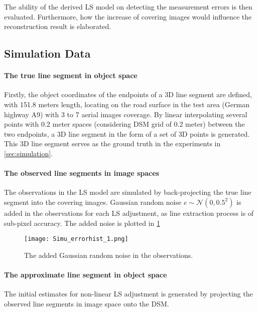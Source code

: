 The ability of the derived LS model on detecting the measurement errors is then evaluated. Furthermore, how the increase of covering images would influence the reconstruction result is elaborated.





\subsection{Simulation Data}
\label{subsec:simudata}

\paragraph{The true line segment in object space}
Firstly, the object coordinates of the endpoints of a 3D line segment are defined, with 151.8 meters length, locating on the road surface in the test area (German highway A9) with 3 to 7 aerial images coverage. By linear interpolating several points with 0.2 meter spaces (considering DSM grid of 0.2 meter) between the two endpoints, a 3D line segment in the form of a set of 3D points is generated. This 3D line segment serves as the ground truth in the experiments in \cref{sec:simulation}. 

\paragraph{The observed line segments in image spaces}
The observations in the LS model are simulated by back-projecting the true line segment into the covering images. Gaussian random noise $e\sim\mathcal{N}(0,0.5^2)$ is added in the observations for each LS adjustment, as line extraction process is of sub-pixel accuracy. The added noise is plotted in \cref{fig:noise}

\begin{figure}
  \centering
  \texttt{[image: Simu\_errorhist\_1.png]}
  \caption{\small The added Gaussian random noise in the observations.}
  \label{fig:noise}
\end{figure}

\paragraph{The approximate line segment in object space}
The initial estimates for non-linear LS adjustment is generated by projecting the observed line segments in image space onto the DSM.

